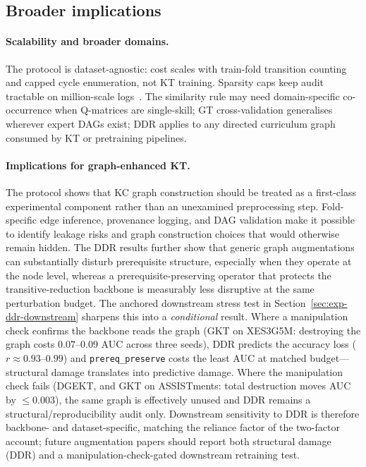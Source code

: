 \documentclass[pdflatex,sn-mathphys-num]{sn-jnl}
\newcommand{\DDR}{\textsc{DDR}}
\begin{document}
\subsection{Broader implications}
\label{sec:disc-implications}

\paragraph{Scalability and broader domains.}
The protocol is dataset-agnostic: cost scales with train-fold transition
counting and capped cycle enumeration, not KT training. Sparsity caps keep
audit tractable on million-scale logs~\cite{choi2020ednet}. The similarity
rule may need domain-specific co-occurrence when Q-matrices are single-skill;
GT cross-validation generalises wherever expert DAGs exist; \DDR{} applies to
any directed curriculum graph consumed by KT or pretraining pipelines.

\paragraph{Implications for graph-enhanced KT.}
The protocol shows that KC graph construction should be treated as a
first-class experimental component rather than an unexamined
preprocessing step. Fold-specific edge inference, provenance logging,
and DAG validation make it possible to identify leakage risks and graph
construction choices that would otherwise remain hidden. The \DDR{}
results further show that generic graph augmentations can substantially
disturb prerequisite structure, especially when they operate at the node
level, whereas a prerequisite-preserving operator that protects the
transitive-reduction backbone is measurably less disruptive at the same
perturbation budget. The anchored downstream stress test in
Section~\ref{sec:exp-ddr-downstream} sharpens this into a \emph{conditional}
result. Where a manipulation check confirms the backbone reads the graph
(GKT on XES3G5M: destroying the graph costs $0.07$--$0.09$ AUC across three seeds), \DDR{}
predicts the accuracy loss ($r{\approx}0.93$--$0.99$) and \texttt{prereq\_preserve} costs the
least AUC at matched budget---structural damage translates into predictive
damage. Where the manipulation check fails (DGEKT, and GKT on ASSISTments:
total destruction moves AUC by ${\le}0.003$), the same graph is effectively
unused and \DDR{} remains a structural/reproducibility audit only. Downstream
sensitivity to \DDR{} is therefore backbone- and dataset-specific, matching the
reliance factor of the two-factor account; future augmentation papers should
report both structural damage (\DDR{}) and a manipulation-check-gated
downstream retraining test.
\end{document}
